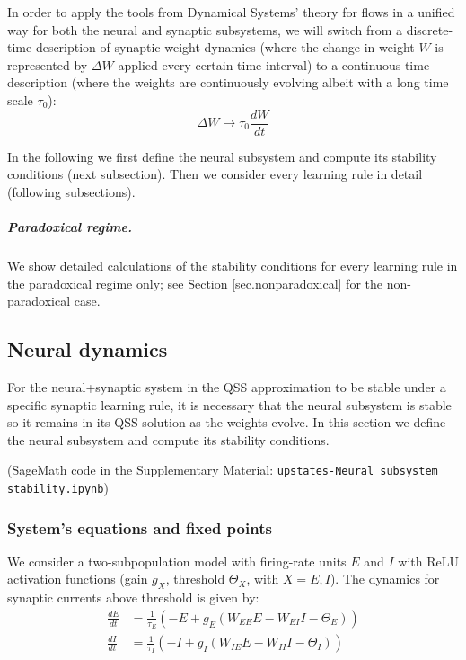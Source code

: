 \documentclass[twocolumn]{article}
\newcommand{\EE}{\mathit{EE}}
\newcommand{\EI}{\mathit{EI}}
\newcommand{\IE}{\mathit{IE}}
\newcommand{\II}{\mathit{II}}
\begin{document}
In order to apply the tools from Dynamical Systems' theory for flows in a unified way for both the neural and synaptic subsystems, we will switch from a discrete-time description of synaptic weight dynamics (where the change in weight $W$ is represented by $\Delta W$ applied every certain time interval) to a continuous-time description (where the weights are continuously evolving albeit with a long time scale $\tau_0$):
\begin{displaymath}
\Delta W \rightarrow \tau_0 \frac{dW}{dt}
\end{displaymath}

In the following we first define the neural subsystem and compute its stability conditions (next subsection). Then we consider every learning rule in detail (following subsections).

\subparagraph{Paradoxical regime.} We show detailed calculations of the stability conditions for every learning rule in the paradoxical regime only; see Section \ref{sec.nonparadoxical} for the non-paradoxical case.



\subsection{Neural dynamics}
\label{sec.neural}

For the neural+synaptic system in the QSS approximation to be stable under a specific synaptic learning rule, it is necessary that the neural subsystem is stable so it remains in its QSS solution as the weights evolve. In this section we define the neural subsystem and compute its stability conditions.

(SageMath code in the Supplementary Material: {\tt upstates-Neural subsystem stability.ipynb})


\subsubsection{System's equations and fixed points}

We consider a two-subpopulation model with firing-rate units $E$ and $I$ with ReLU activation functions (gain $g_X$, threshold $\Theta_X$, with $X=E,I$). The dynamics for synaptic currents above threshold is given by:
\begin{equation}
\begin{aligned}
\frac{dE}{dt} & = \frac{1}{\tau_E}(-E + g_E(W_{\EE}E - W_{\EI}I - \Theta_E)) \\
\frac{dI}{dt} & = \frac{1}{\tau_I}(-I + g_I(W_{\IE}E - W_{\II}I - \Theta_I))
\end{aligned}
\label{eq.neural}
\end{equation}
\end{document}
